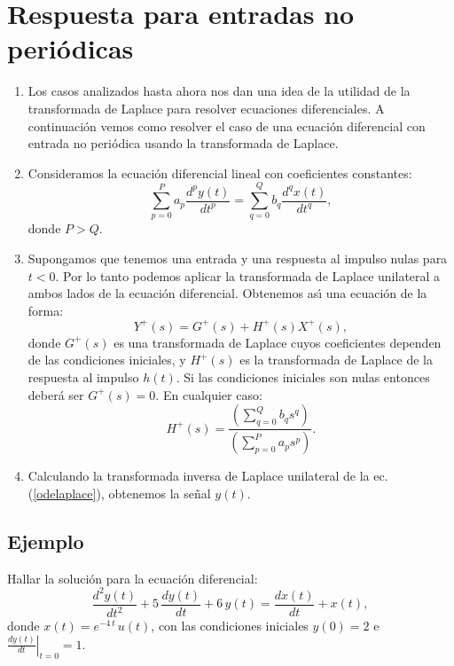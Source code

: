 \section{Respuesta para entradas no peri\'{o}dicas}

\begin{enumerate}
	\item Los casos analizados hasta ahora nos dan una idea de la utilidad de la transformada de Laplace para resolver ecuaciones diferenciales. A continuaci\'{o}n vemos como resolver el caso de una ecuaci\'{o}n diferencial con entrada no peri\'{o}dica usando la transformada de Laplace.
	
	\item Consideramos la ecuaci\'{o}n diferencial lineal con coeficientes constantes:
	\begin{equation}
		\sum_{p=0}^{P}a_{p}\frac{d^{p}y\left( t\right) }{dt^{p}}=
		\sum_{q=0}^{Q}b_{q}\frac{d^{q}x\left( t\right) }{dt^{q}},
	\end{equation}
	donde $P > Q$.
	
	\item Supongamos que tenemos una entrada y una respuesta al impulso nulas para $t < 0$. Por lo tanto podemos aplicar la transformada de Laplace unilateral a ambos lados de la ecuaci\'{o}n diferencial. Obtenemos as\'{\i} una ecuaci\'{o}n de la forma:
	\begin{equation}
		Y^{+}(s) = G^{+}(s) + H^{+}(s) X^{+}(s), \label{odelaplace}
	\end{equation}
	donde $G^{+}(s)$ es una transformada de Laplace cuyos coeficientes dependen de las condiciones iniciales, y $H^{+}(s)$ es la transformada de Laplace de la respuesta al impulso $h(t)$. Si las condiciones iniciales son nulas entonces deber\'{a} ser $G^{+}(s) = 0$. En cualquier caso:
	\begin{equation}
		H^{+}(s) = \frac{\left( \sum_{q=0}^{Q}b_{q}s^{q}\right) }{\left(\sum_{p=0}^{P}a_{p}s^{p}\right) }.
	\end{equation}
	
	\item Calculando la transformada inversa de Laplace unilateral de la ec. (\ref{odelaplace}), obtenemos la se\~{n}al $y(t)$.
\end{enumerate}

\subsection{Ejemplo}

Hallar la soluci\'{o}n para la ecuaci\'{o}n diferencial:
\begin{equation}
	\frac{d^{2}y(t)}{dt^{2}} + 5 \, \frac{dy(t)}{dt} + 6 \, y(t) = 
	\frac{dx(t)}{dt} + x(t),
\end{equation}
donde $x(t) = e^{-4 \, t} \, u(t)$, con las condiciones iniciales $y(0) = 2$ e $\left. \frac{dy(t)}{dt} \right|_{t=0} = 1$.

